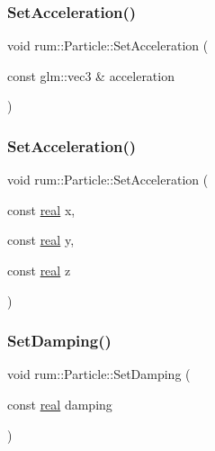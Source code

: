 \subsubsection{\texorpdfstring{Set\+Acceleration()}{SetAcceleration()}\hspace{0.1cm}{\footnotesize\ttfamily [1/2]}}
{\footnotesize\ttfamily void rum\+::\+Particle\+::\+Set\+Acceleration (\begin{DoxyParamCaption}\item[{const glm\+::vec3 \&}]{acceleration }\end{DoxyParamCaption})}

\mbox{\label{classrum_1_1_particle_abfc528b024698e69b09b33ca6828f551}} 
\subsubsection{\texorpdfstring{Set\+Acceleration()}{SetAcceleration()}\hspace{0.1cm}{\footnotesize\ttfamily [2/2]}}
{\footnotesize\ttfamily void rum\+::\+Particle\+::\+Set\+Acceleration (\begin{DoxyParamCaption}\item[{const \hyperlink{namespacerum_a7e8cca23573d5eaead0f138cbaa4862c}{real}}]{x,  }\item[{const \hyperlink{namespacerum_a7e8cca23573d5eaead0f138cbaa4862c}{real}}]{y,  }\item[{const \hyperlink{namespacerum_a7e8cca23573d5eaead0f138cbaa4862c}{real}}]{z }\end{DoxyParamCaption})}

\mbox{\label{classrum_1_1_particle_a9472726d229860f267dc8b7e8b7fe2cc}} 
\subsubsection{\texorpdfstring{Set\+Damping()}{SetDamping()}}
{\footnotesize\ttfamily void rum\+::\+Particle\+::\+Set\+Damping (\begin{DoxyParamCaption}\item[{const \hyperlink{namespacerum_a7e8cca23573d5eaead0f138cbaa4862c}{real}}]{damping }\end{DoxyParamCaption})}

